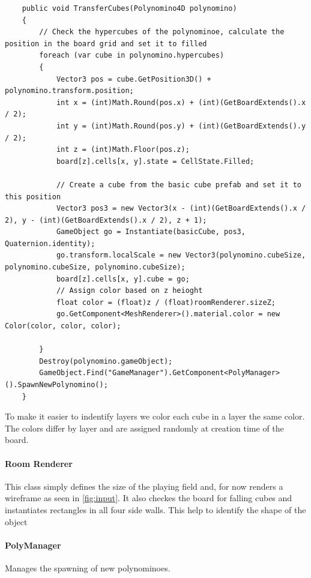 \documentclass{article}
\begin{document}
\begin{verbatim}
    public void TransferCubes(Polynomino4D polynomino)
    {
        // Check the hypercubes of the polynominoe, calculate the position in the board grid and set it to filled
        foreach (var cube in polynomino.hypercubes)
        {
            Vector3 pos = cube.GetPosition3D() + polynomino.transform.position;
            int x = (int)Math.Round(pos.x) + (int)(GetBoardExtends().x / 2);
            int y = (int)Math.Round(pos.y) + (int)(GetBoardExtends().y / 2);
            int z = (int)Math.Floor(pos.z);
            board[z].cells[x, y].state = CellState.Filled;
 
            // Create a cube from the basic cube prefab and set it to this position
            Vector3 pos3 = new Vector3(x - (int)(GetBoardExtends().x / 2), y - (int)(GetBoardExtends().x / 2), z + 1);
            GameObject go = Instantiate(basicCube, pos3, Quaternion.identity);
            go.transform.localScale = new Vector3(polynomino.cubeSize, polynomino.cubeSize, polynomino.cubeSize);
            board[z].cells[x, y].cube = go;
            // Assign color based on z heioght
            float color = (float)z / (float)roomRenderer.sizeZ;
            go.GetComponent<MeshRenderer>().material.color = new Color(color, color, color);
 
        }
        Destroy(polynomino.gameObject);
        GameObject.Find("GameManager").GetComponent<PolyManager>().SpawnNewPolynomino();
    }
\end{verbatim}
To make it easier to indentify layers we color each cube in a layer the same color. The colors differ by layer and are assigned randomly at creation time of the board.


\paragraph{Room Renderer}
This class simply defines the size of the playing field and, for now renders a wireframe as seen in \ref{fig:input}. It also checkes the board for falling cubes and instantiates rectangles in all four side walls. This help to identify the shape of the object 

\paragraph{PolyManager}
Manages the spawning of new polynominoes. 
\end{document}
